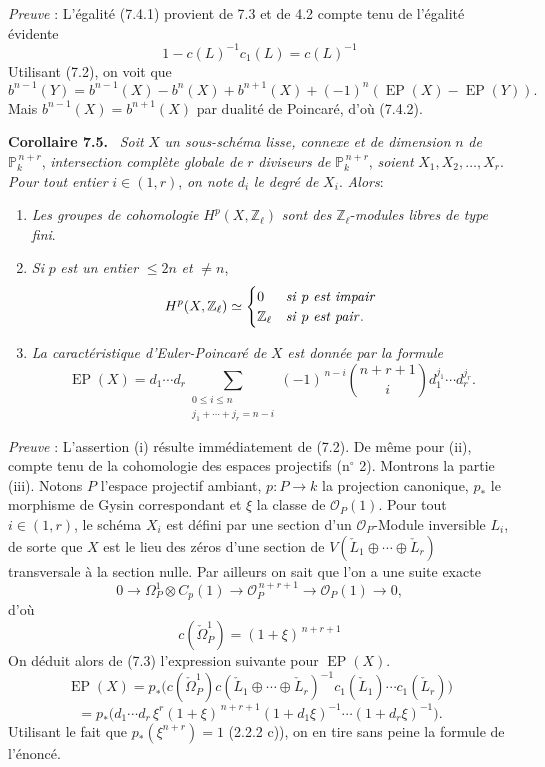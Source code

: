 \documentclass[11pt]{article}
\newenvironment{statement}[1]{\par\medskip\noindent\textbf{#1.}\ }{\par\medskip}
\begin{document}
\emph{Preuve} : L'égalité (7.4.1) provient de 7.3 et de 4.2 compte tenu de l'égalité évidente
\[
1-c(L)^{-1}c_1(L)=c(L)^{-1}
\]
Utilisant (7.2), on voit que
\[
b^{n-1}(Y)=b^{n-1}(X)-b^n(X)+b^{n+1}(X)+(-1)^n(\operatorname{EP}(X)-\operatorname{EP}(Y)).
\]
Mais $b^{n-1}(X)=b^{n+1}(X)$ par dualité de Poincaré, d'où (7.4.2).

\begin{statement}{Corollaire 7.5}
\emph{Soit} $X$ \emph{un sous-schéma lisse, connexe et de dimension} $n$ \emph{de} $\mathbb P_k^{\,n+r}$, \emph{intersection complète globale de} $r$ \emph{diviseurs de} $\mathbb P_k^{\,n+r}$, \emph{soient} $X_1,X_2,\ldots,X_r$. \emph{Pour tout entier} $i\in(1,r)$, \emph{on note} $d_i$ \emph{le degré de} $X_i$. \emph{Alors}:
\begin{enumerate}[label=(\roman*)]
\item \emph{Les groupes de cohomologie} $H^p(X,\mathbb Z_\ell)$ \emph{sont des} $\mathbb Z_\ell$-\emph{modules libres de type fini}.
\item \emph{Si} $p$ \emph{est un entier} $\le 2n$ \emph{et} $\ne n$,
\[
H^p(X,\mathbb Z_\ell)\simeq
\begin{cases}
0&\text{\emph{si} }p\text{ \emph{est impair}}\\
\mathbb Z_\ell&\text{\emph{si} }p\text{ \emph{est pair}}.
\end{cases}
\]
\item \emph{La caractéristique d'Euler-Poincaré de} $X$ \emph{est donnée par la formule}
\[
\operatorname{EP}(X)
=d_1\cdots d_r
\sum_{\substack{0\le i\le n\\ j_1+\cdots+j_r=n-i}}
(-1)^{\,n-i}\binom{n+r+1}{i}
d_1^{j_1}\cdots d_r^{j_r}.
\]
\end{enumerate}
\end{statement}

\emph{Preuve} : L'assertion (i) résulte immédiatement de (7.2). De même pour (ii), compte tenu de la cohomologie des espaces projectifs (n$^\circ$ 2). Montrons la partie (iii). Notons $P$ l'espace projectif ambiant, $p:P\to k$ la projection canonique, $p_*$ le morphisme de Gysin 
correspondant et $\xi$ la classe de $\mathcal O_P(1)$. Pour tout $i\in(1,r)$, le schéma $X_i$ est défini par une
section d'un $\mathcal O_P$-Module inversible $L_i$, de sorte que $X$ est le lieu des zéros d'une section de $V(\check L_1\oplus\cdots\oplus\check L_r)$ transversale à la section nulle. Par ailleurs on sait que l'on a une suite exacte
\[
0\to\Omega_P^1\otimes C_p(1)\to\mathcal O_P^{\,n+r+1}\to\mathcal O_P(1)\to0,
\]
d'où
\[
c(\check\Omega_P^1)=(1+\xi)^{\,n+r+1}
\]
On déduit alors de (7.3) l'expression suivante pour $\operatorname{EP}(X)$.
\[
\operatorname{EP}(X)
=p_*\bigl(c(\check\Omega_P^1)c(\check L_1\oplus\cdots\oplus\check L_r)^{-1}
c_1(\check L_1)\cdots c_1(\check L_r)\bigr)
\]
\[
=p_*\bigl(d_1\cdots d_r\,\xi^r(1+\xi)^{\,n+r+1}
(1+d_1\xi)^{-1}\cdots(1+d_r\xi)^{-1}\bigr).
\]
Utilisant le fait que $p_*(\xi^{n+r})=1$ (2.2.2 c)), on en tire sans peine la formule de l'énoncé.
\end{document}
